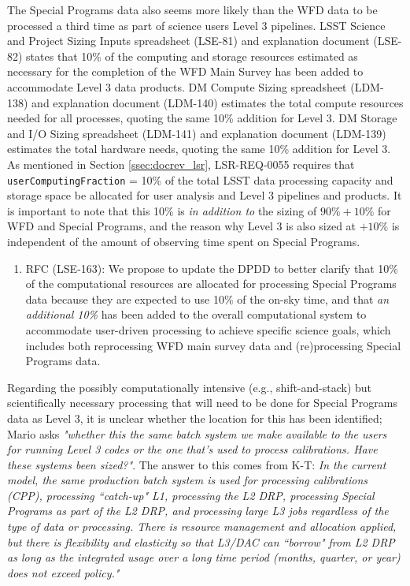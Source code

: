 \documentclass[DM,lsstdraft,toc]{lsstdoc}
\begin{document}
The Special Programs data also seems more likely than the WFD data to be processed a third time as part of science users Level 3 pipelines. LSST Science and Project Sizing Inputs spreadsheet (LSE-81) and explanation document (LSE-82) states that 10\% of the computing and storage resources estimated as necessary for the completion of the WFD Main Survey has been added to accommodate Level 3 data products. DM Compute Sizing spreadsheet (LDM-138) and explanation document (LDM-140) estimates the total compute resources needed for all processes, quoting the same 10\% addition for Level 3. DM Storage and I/O Sizing spreadsheet (LDM-141) and explanation document (LDM-139) estimates the total hardware needs, quoting the same 10\% addition for Level 3. As mentioned in Section \ref{ssec:docrev_lsr}, LSR-REQ-0055 requires that {\tt userComputingFraction} = 10\% of the total LSST data processing capacity and storage space be allocated for user analysis and Level 3 pipelines and products. It is important to note that this 10\% is {\it in addition to} the sizing of $90\%+10\%$ for WFD and Special Programs, and the reason why Level 3 is also sized at $+10\%$ is independent of the amount of observing time spent on Special Programs.

\begin{enumerate}[resume,topsep=-10pt,label= \textbf{Action \Roman*}] \item \label{Size-1} RFC (LSE-163): We propose to update the DPDD to better clarify that 10\% of the computational resources are allocated for processing Special Programs data because they are expected to use 10\% of the on-sky time, and that {\it an additional 10\%} has been added to the overall computational system to accommodate user-driven processing to achieve specific science goals, which includes both reprocessing WFD main survey data and (re)processing Special Programs data. \end{enumerate}

Regarding the possibly computationally intensive (e.g., shift-and-stack) but scientifically necessary processing that will need to be done for Special Programs data as Level 3, it is unclear whether the location for this has been identified; Mario asks {\it "whether this the same batch system we make available to the users for running Level 3 codes or the one that's used to process calibrations. Have these systems been sized?"}. The answer to this comes from K-T: {\it In the current model, the same production batch system is used for processing calibrations (CPP), processing ``catch-up" L1, processing the L2 DRP, processing Special Programs as part of the L2 DRP, and processing large L3 jobs regardless of the type of data or processing. There is resource management and allocation applied, but there is flexibility and elasticity so that L3/DAC can ``borrow" from L2 DRP as long as the integrated usage over a long time period (months, quarter, or year) does not exceed policy."}
\end{document}
